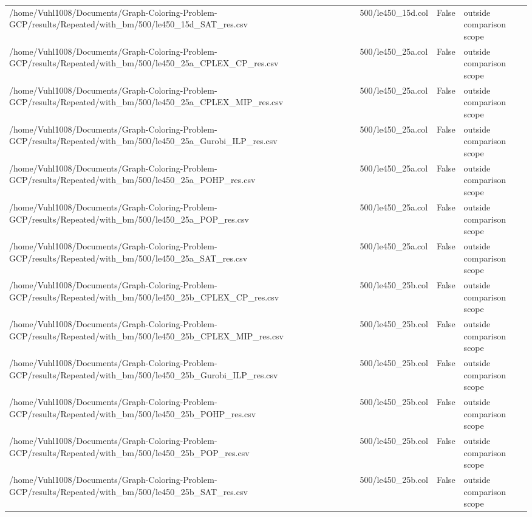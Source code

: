 \begin{table}[htbp]
\begin{tabular}{llll}
/home/Vuhl1008/Documents/Graph-Coloring-Problem-GCP/results/Repeated/with\_bm/500/le450\_15d\_SAT\_res.csv & 500/le450\_15d.col & False & outside comparison scope \\
/home/Vuhl1008/Documents/Graph-Coloring-Problem-GCP/results/Repeated/with\_bm/500/le450\_25a\_CPLEX\_CP\_res.csv & 500/le450\_25a.col & False & outside comparison scope \\
/home/Vuhl1008/Documents/Graph-Coloring-Problem-GCP/results/Repeated/with\_bm/500/le450\_25a\_CPLEX\_MIP\_res.csv & 500/le450\_25a.col & False & outside comparison scope \\
/home/Vuhl1008/Documents/Graph-Coloring-Problem-GCP/results/Repeated/with\_bm/500/le450\_25a\_Gurobi\_ILP\_res.csv & 500/le450\_25a.col & False & outside comparison scope \\
/home/Vuhl1008/Documents/Graph-Coloring-Problem-GCP/results/Repeated/with\_bm/500/le450\_25a\_POHP\_res.csv & 500/le450\_25a.col & False & outside comparison scope \\
/home/Vuhl1008/Documents/Graph-Coloring-Problem-GCP/results/Repeated/with\_bm/500/le450\_25a\_POP\_res.csv & 500/le450\_25a.col & False & outside comparison scope \\
/home/Vuhl1008/Documents/Graph-Coloring-Problem-GCP/results/Repeated/with\_bm/500/le450\_25a\_SAT\_res.csv & 500/le450\_25a.col & False & outside comparison scope \\
/home/Vuhl1008/Documents/Graph-Coloring-Problem-GCP/results/Repeated/with\_bm/500/le450\_25b\_CPLEX\_CP\_res.csv & 500/le450\_25b.col & False & outside comparison scope \\
/home/Vuhl1008/Documents/Graph-Coloring-Problem-GCP/results/Repeated/with\_bm/500/le450\_25b\_CPLEX\_MIP\_res.csv & 500/le450\_25b.col & False & outside comparison scope \\
/home/Vuhl1008/Documents/Graph-Coloring-Problem-GCP/results/Repeated/with\_bm/500/le450\_25b\_Gurobi\_ILP\_res.csv & 500/le450\_25b.col & False & outside comparison scope \\
/home/Vuhl1008/Documents/Graph-Coloring-Problem-GCP/results/Repeated/with\_bm/500/le450\_25b\_POHP\_res.csv & 500/le450\_25b.col & False & outside comparison scope \\
/home/Vuhl1008/Documents/Graph-Coloring-Problem-GCP/results/Repeated/with\_bm/500/le450\_25b\_POP\_res.csv & 500/le450\_25b.col & False & outside comparison scope \\
/home/Vuhl1008/Documents/Graph-Coloring-Problem-GCP/results/Repeated/with\_bm/500/le450\_25b\_SAT\_res.csv & 500/le450\_25b.col & False & outside comparison scope \\

\end{tabular}
\end{table}
